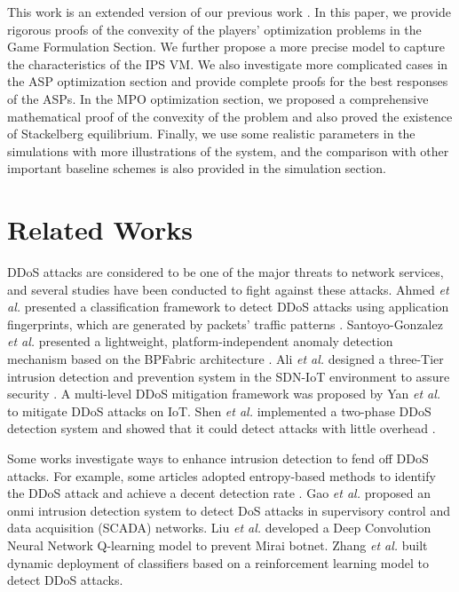 \documentclass[10pt,journal, compsoc]{IEEEtran}
\begin{document}
This work is an extended version of our previous work \cite{Chang2}. In this paper, we provide rigorous proofs of the convexity of the players' optimization problems in the Game Formulation Section. We further propose a more precise model to capture the characteristics of the IPS VM. We also investigate more complicated cases in the ASP optimization section and provide complete proofs for the best responses of the ASPs. In the MPO optimization section, we proposed a comprehensive mathematical proof of the convexity of the problem and also proved the existence of Stackelberg equilibrium. Finally, we use some realistic parameters in the simulations with more illustrations of the system, and the comparison with other important baseline schemes is also provided in the simulation section.

\section{Related Works}

DDoS attacks are considered to be one of the major threats to network services, and several studies have been conducted to fight against these attacks. Ahmed \emph{et al.} presented a classification framework to detect DDoS attacks using application fingerprints, which are generated by packets' traffic patterns \cite{Ahmed}. Santoyo-Gonzalez \emph{et al.} presented a lightweight, platform-independent anomaly detection mechanism based on the BPFabric architecture \cite{Santoyo-Gonzalez}. Ali \emph{et al.} designed a three-Tier intrusion detection and prevention system in the SDN-IoT environment to assure security \cite{Ali}. A multi-level DDoS mitigation framework \cite{Yan} was proposed by Yan \emph{et al.} to mitigate DDoS attacks on IoT. Shen \emph{et al.} implemented a two-phase DDoS detection system and showed that it could detect attacks with little overhead \cite{Shen}.


Some works investigate ways to enhance intrusion detection to fend off DDoS attacks. For example, some articles adopted entropy-based methods to identify the DDoS attack and achieve a decent detection rate \cite{Kalkan}\cite{Tsobdjou}. Gao \emph{et al.} proposed an onmi intrusion detection system to detect DoS attacks in supervisory control and data acquisition (SCADA) networks\cite{Gao}. Liu \emph{et al.} developed a Deep Convolution Neural Network Q-learning model to prevent Mirai botnet\cite{Liu}. Zhang \emph{et al.} built dynamic deployment of classifiers based on a reinforcement learning model to detect DDoS attacks\cite{Zhang}.
\end{document}
